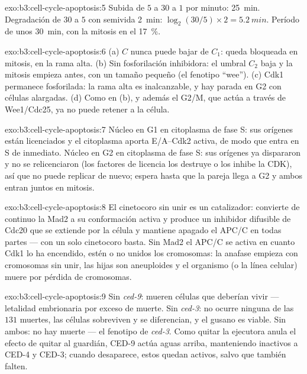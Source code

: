 \begin{solution}{exo:b3:cell-cycle-apoptosis:5}
Subida de $5$ a $30$ a $1$ por minuto: \qty{25}{min}. Degradación de $30$
a $5$ con semivida \qty{2}{min}: $\log_{2}(30/5)\times 2 =
\qty{5.2}{min}$. Período de unos \qty{30}{min}, con la mitosis en el
\qty{17}{\%}.
\end{solution}

\begin{solution}{exo:b3:cell-cycle-apoptosis:6}
(a) $C$ nunca puede bajar de $C_{1}$: queda bloqueada en mitosis, en la
rama alta. (b) Sin fosforilación inhibidora: el umbral $C_{2}$ baja y la
mitosis empieza antes, con un tamaño pequeño (el fenotipo ``wee'').
(c) Cdk1 permanece fosforilada: la rama alta es inalcanzable, y hay
parada en G2 con células alargadas. (d) Como en (b), y además el  G2/M, que actúa a través de Wee1/Cdc25, ya no puede retener a la
célula.
\end{solution}

\begin{solution}{exo:b3:cell-cycle-apoptosis:7}
Núcleo en G1 en citoplasma de fase S: sus orígenes están licenciados y el
citoplasma aporta  E/A--Cdk2 activa, de modo que entra en S de
inmediato. Núcleo en G2 en citoplasma de fase S: sus orígenes ya
dispararon y no se relicenciaron (los factores de licencia los destruye o
los inhibe la CDK), así que no puede replicar de nuevo; espera hasta que
la pareja llega a G2 y ambos entran juntos en mitosis.
\end{solution}

\begin{solution}{exo:b3:cell-cycle-apoptosis:8}
El cinetocoro sin unir es un catalizador: convierte de continuo la Mad2 a
su conformación activa y produce un inhibidor difusible de Cdc20 que se
extiende por la célula y mantiene apagado el APC/C en todas partes ---
con un solo cinetocoro basta. Sin Mad2 el APC/C se activa en cuanto Cdk1
lo ha encendido, estén o no unidos los cromosomas: la anafase empieza con
cromosomas sin unir, las hijas son aneuploides y el organismo (o la línea
celular) muere por pérdida de cromosomas.
\end{solution}

\begin{solution}{exo:b3:cell-cycle-apoptosis:9}
Sin \emph{ced-9}: mueren células que deberían vivir --- letalidad
embrionaria por exceso de muerte. Sin \emph{ced-3}: no ocurre ninguna de
las $131$ muertes, las células sobreviven y se diferencian, y el gusano
es viable. Sin ambos: no hay muerte --- el fenotipo de \emph{ced-3}. Como
quitar la ejecutora anula el efecto de quitar al guardián, CED-9 actúa
aguas arriba, manteniendo inactivos a CED-4 y CED-3; cuando desaparece,
estos quedan activos, salvo que también falten.
\end{solution}


